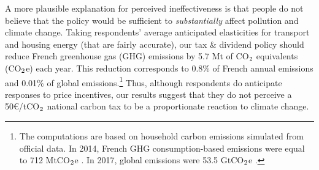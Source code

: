\documentclass[12pt]{article} %
\begin{document}
A more plausible explanation for perceived ineffectiveness is that people do not believe that the policy would be sufficient to \textit{substantially} affect pollution and climate change. Taking respondents' average anticipated elasticities for transport and housing energy (that are fairly accurate), our tax \& dividend policy should reduce French greenhouse gas (GHG) emissions by 5.7 Mt of CO$_\textnormal{2}$ equivalents (CO$_\textnormal{2}$e) each year. This reduction corresponds to 0.8\% of French annual emissions and 0.01\% of global emissions.\footnote{The computations are based on household carbon emissions simulated from official data. In 2014, French GHG consumption-based emissions were equal to 712 MtCO$_\textnormal{2}$e \citep{cgdd_chiffres_2019}. In 2017, global emissions were 53.5 GtCO$_\textnormal{2}$e \citep{unep_emissions_2018}.} Thus, although respondents do anticipate responses to price incentives, our results suggest that they do not perceive a 50\euro{}/tCO$_\textnormal{2}$ national carbon tax to be a proportionate reaction to climate change.
\end{document}
